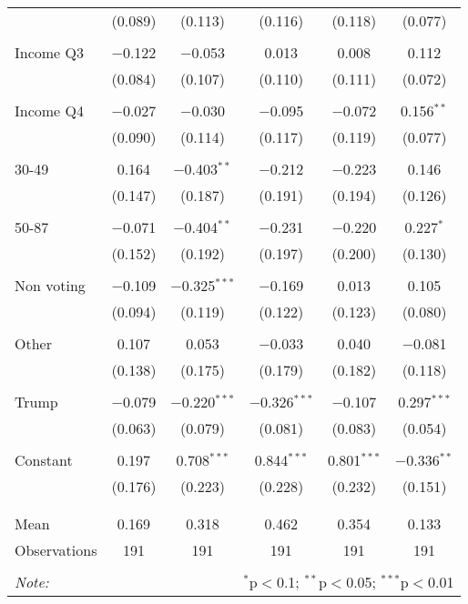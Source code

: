 \begin{tabular}{@{\extracolsep{5pt}}lccccc}
  & (0.089) & (0.113) & (0.116) & (0.118) & (0.077) \\ 
  & & & & & \\ 
 Income Q3 & $-$0.122 & $-$0.053 & 0.013 & 0.008 & 0.112 \\ 
  & (0.084) & (0.107) & (0.110) & (0.111) & (0.072) \\ 
  & & & & & \\ 
 Income Q4 & $-$0.027 & $-$0.030 & $-$0.095 & $-$0.072 & 0.156$^{**}$ \\ 
  & (0.090) & (0.114) & (0.117) & (0.119) & (0.077) \\ 
  & & & & & \\ 
 30-49 & 0.164 & $-$0.403$^{**}$ & $-$0.212 & $-$0.223 & 0.146 \\ 
  & (0.147) & (0.187) & (0.191) & (0.194) & (0.126) \\ 
  & & & & & \\ 
 50-87 & $-$0.071 & $-$0.404$^{**}$ & $-$0.231 & $-$0.220 & 0.227$^{*}$ \\ 
  & (0.152) & (0.192) & (0.197) & (0.200) & (0.130) \\ 
  & & & & & \\ 
 Non voting & $-$0.109 & $-$0.325$^{***}$ & $-$0.169 & 0.013 & 0.105 \\ 
  & (0.094) & (0.119) & (0.122) & (0.123) & (0.080) \\ 
  & & & & & \\ 
 Other & 0.107 & 0.053 & $-$0.033 & 0.040 & $-$0.081 \\ 
  & (0.138) & (0.175) & (0.179) & (0.182) & (0.118) \\ 
  & & & & & \\ 
 Trump & $-$0.079 & $-$0.220$^{***}$ & $-$0.326$^{***}$ & $-$0.107 & 0.297$^{***}$ \\ 
  & (0.063) & (0.079) & (0.081) & (0.083) & (0.054) \\ 
  & & & & & \\ 
 Constant & 0.197 & 0.708$^{***}$ & 0.844$^{***}$ & 0.801$^{***}$ & $-$0.336$^{**}$ \\ 
  & (0.176) & (0.223) & (0.228) & (0.232) & (0.151) \\ 
  & & & & & \\ 
\hline \\[-1.8ex] 
Mean & 0.169 & 0.318 & 0.462 & 0.354 & 0.133 \\ 
Observations & 191 & 191 & 191 & 191 & 191 \\ 
\hline 
\hline \\[-1.8ex] 
\textit{Note:}  & \multicolumn{5}{r}{$^{*}$p$<$0.1; $^{**}$p$<$0.05; $^{***}$p$<$0.01} \\ 
\end{tabular} 
